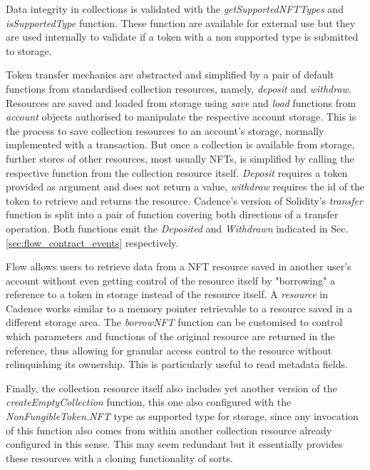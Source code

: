 \documentclass[../main.tex]{subfiles}
\begin{document}
Data integrity in collections is validated with the \textit{getSupportedNFTTypes} and \textit{isSupportedType} function. These function are available for external use but they are used internally to validate if a token with a non supported type is submitted to storage.
\par
Token transfer mechanics are abstracted and simplified by a pair of default functions from standardised collection resources, namely, \textit{deposit} and \textit{withdraw}. Resources are saved and loaded from storage using \textit{save} and \textit{load} functions from \textit{account} objects authorised to manipulate the respective account storage. This is the process to save collection resources to an account's storage, normally implemented with a transaction. But once a collection is available from storage, further stores of other resources, most usually NFTs, is simplified by calling the respective function from the collection resource itself. \textit{Deposit} requires a token provided as argument and does not return a value, \textit{withdraw} requires the id of the token to retrieve and returns the resource. Cadence's version of Solidity's \textit{transfer} function is split into a pair of function covering both directions of a transfer operation. Both functions emit the \textit{Deposited} and \textit{Withdrawn} indicated in Sec. \ref{sec:flow_contract_events} respectively.
\par
Flow allows users to retrieve data from a NFT resource saved in another user's account without even getting control of the resource itself by "borrowing" a reference to a token in storage instead of the resource itself. A \textit{resource} in Cadence works similar to a memory pointer retrievable to a resource saved in a different storage area. The \textit{borrowNFT} function can be customised to control which parameters and functions of the original resource are returned in the reference, thus allowing for granular access control to the resource without relinquishing its ownership. This is particularly useful to read metadata fields.
\par
Finally, the collection resource itself also includes yet another version of the \textit{createEmptyCollection} function, this one also configured with the \textit{NonFungibleToken.NFT} type as supported type for storage, since any invocation of this function also comes from within another collection resource already configured in this sense. This may seem redundant but it essentially provides these resources with a cloning functionality of sorts.
\end{document}
